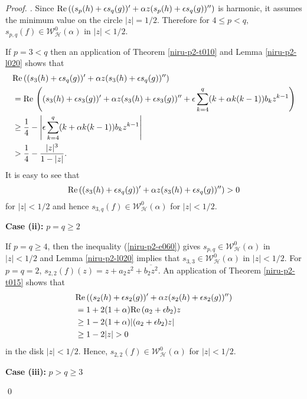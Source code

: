 \documentclass[a4paper,12pt]{amsart}
\theoremstyle{plain}
\theoremstyle{definition}
\newenvironment{pf}[1][]{ \vskip 3mm
 \noindent
 \ifthenelse{\equal{#1}{}}  {{\slshape Proof. }}  {{\slshape #1.} } }{\qed\bigskip}
\begin{document}
\begin{pf}
Since ${\rm Re\,}((s_p(h) + \epsilon s_q(g))' + \alpha z (s_p(h) + \epsilon s_q(g))'')$ is harmonic, it assumes the minimum value on the circle $|z| = 1/2$. Therefore for  $4 \leq p < q,$ $s_{p,q}(f)\in\mathcal{W}^0_{\mathcal{H}}(\alpha)$ in  $|z|< 1/2$.

If $p =3 < q$ then an application of Theorem \ref{niru-p2-t010} and Lemma \ref{niru-p2-l020} shows that
\begin{align*}
&{\rm Re\,}((s_3(h) + \epsilon s_q(g))' + \alpha z (s_3(h) + \epsilon s_q(g))'')\\
& = {\rm Re\,}\left((s_3(h) + \epsilon s_3(g))' + \alpha z (s_3(h) + \epsilon s_3(g))'' + \epsilon \sum_{k =4}^{q}(k + \alpha k (k -1))b_k z^{k-1}\right)\\
& \geq \frac{1}{4}- \left|\epsilon \sum_{k =4}^{q}(k + \alpha k (k -1))b_k z^{k-1}\right|\\
& > \frac{1}{4} - \frac{|z|^3}{1 - |z|}.
\end{align*}
It is easy to see that
$$
{\rm Re\,}((s_3(h) + \epsilon s_q(g))' + \alpha z (s_3(h) + \epsilon s_q(g))'') > 0
$$
for $|z|< 1/2$ and hence $s_{3, q}(f)\in\mathcal{W}^0_{\mathcal{H}}(\alpha)$ for  $|z|< 1/2$.

{\bf Case (ii):} $p = q \geq 2$

If $ p = q \geq 4$, then the inequality (\ref{niru-p2-e060})  gives $s_{p, q}\in\mathcal{W}^0_{\mathcal{H}}(\alpha)$ in $|z|< 1/2$ and Lemma  \ref{niru-p2-l020} implies that $s_{3, 3}\in\mathcal{W}^0_{\mathcal{H}}(\alpha)$ in $|z|< 1/2$. For $ p = q = 2$, $s_{2, 2}(f)(z) = z + a_2 z^2 + \overline{b_2 z^2}$.  An application of Theorem \ref{niru-p2-t015} shows that
\begin{align*}
&{\rm Re\,}((s_2(h) + \epsilon s_2(g))' + \alpha z (s_2(h) + \epsilon s_2(g))'')\\
& = 1 + 2 (1 + \alpha){\rm Re\,}(a_2 + \epsilon b_2) z\\
& \geq 1 - 2 (1 + \alpha) |(a_2 + \epsilon b_2) z|\\
& \geq 1 - 2|z| > 0
\end{align*}
in the disk $|z|< 1/2$. Hence, $s_{2, 2}(f)\in\mathcal{W}^0_{\mathcal{H}}(\alpha)$ for  $|z|< 1/2$.

{\bf Case (iii):} $p> q \geq 3$


\end{pf}
\end{document}
